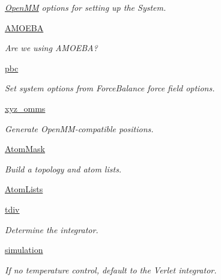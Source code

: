 \begin{DoxyCompactItemize}
\begin{DoxyCompactList}\small\item\em \hyperlink{classforcebalance_1_1openmmio_1_1OpenMM}{Open\-M\-M} options for setting up the System. \end{DoxyCompactList}\item 
\hyperlink{classforcebalance_1_1openmmio_1_1OpenMM_a894bea578801f5dd398ec8f1a5514cbb}{A\-M\-O\-E\-B\-A}
\begin{DoxyCompactList}\small\item\em Are we using A\-M\-O\-E\-B\-A? \end{DoxyCompactList}\item 
\hyperlink{classforcebalance_1_1openmmio_1_1OpenMM_a423cc02bb7781ae7aa593960a5912b52}{pbc}
\begin{DoxyCompactList}\small\item\em Set system options from Force\-Balance force field options. \end{DoxyCompactList}\item 
\hyperlink{classforcebalance_1_1openmmio_1_1OpenMM_a66bf0f7944c5265a95594151b0840ebf}{xyz\-\_\-omms}
\begin{DoxyCompactList}\small\item\em Generate Open\-M\-M-\/compatible positions. \end{DoxyCompactList}\item 
\hyperlink{classforcebalance_1_1openmmio_1_1OpenMM_ab8bbe3c82b157183b54c67f3973cb2ea}{Atom\-Mask}
\begin{DoxyCompactList}\small\item\em Build a topology and atom lists. \end{DoxyCompactList}\item 
\hyperlink{classforcebalance_1_1openmmio_1_1OpenMM_a4dc04cc62a82997528627c6050235a64}{Atom\-Lists}
\item 
\hyperlink{classforcebalance_1_1openmmio_1_1OpenMM_a743983d151ddc558ad2143304e6e4e67}{tdiv}
\begin{DoxyCompactList}\small\item\em Determine the integrator. \end{DoxyCompactList}\item 
\hyperlink{classforcebalance_1_1openmmio_1_1OpenMM_ae8231543cc70b8dcc3e832a185ef3d2f}{simulation}
\begin{DoxyCompactList}\small\item\em If no temperature control, default to the Verlet integrator. \end{DoxyCompactList}\item 

\end{DoxyCompactItemize}
